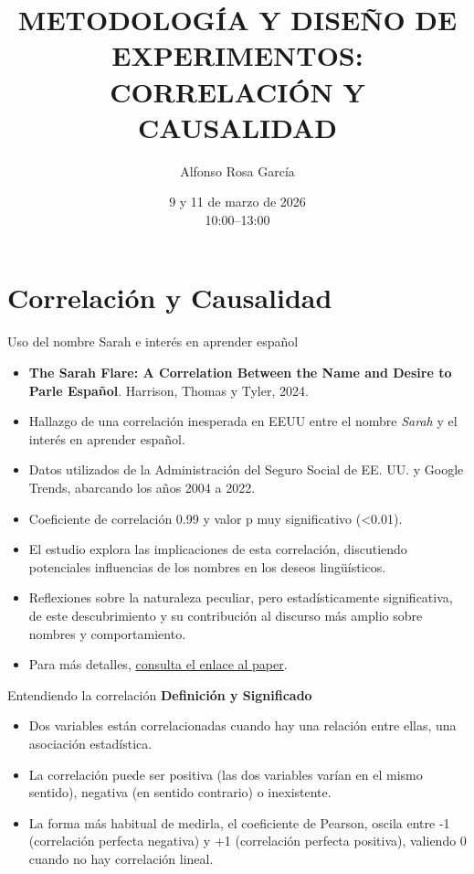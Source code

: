 ﻿\documentclass{beamer}
\title[DISEÑO DE EXPERIMENTOS]{METODOLOGÍA Y DISEÑO DE EXPERIMENTOS: \\ CORRELACIÓN Y CAUSALIDAD}
\author[Alfonso Rosa García]{Alfonso Rosa García }
\institute[G9]{\textbf{Grupo de Universidades G-9}}
\date{9 y 11 de marzo de 2026 \\ 10:00--13:00}
\begin{document}
\begin{frame}
  \titlepage
\end{frame}



\section{Correlación y Causalidad}

\begin{frame}{Uso del nombre Sarah e interés en aprender español}
  \begin{itemize}
    \item  \textbf{The Sarah Flare: A Correlation Between the Name and Desire to
Parle Español}. Harrison, Thomas y Tyler, 2024.
    \item Hallazgo de una correlación inesperada en EEUU entre el nombre \textit{Sarah} y el interés en aprender español.
    \item Datos utilizados de la Administración del Seguro Social de EE. UU. y Google Trends, abarcando los años 2004 a 2022.
    \item Coeficiente de correlación 0.99 y valor p muy significativo (\textless{}0.01).
    \item El estudio explora las implicaciones de esta correlación, discutiendo potenciales influencias de los nombres en los deseos lingüísticos.
    \item Reflexiones sobre la naturaleza peculiar, pero estadísticamente significativa, de este descubrimiento y su contribución al discurso más amplio sobre nombres y comportamiento.
    \item Para más detalles, \href{https://tylervigen.com/spurious/research-papers/4240_the-sarah-flare-a-correlation-between-the-name-and-desire-to-parle-espaol.pdf}{consulta el enlace al paper}.
    \end{itemize}
\end{frame}
\begin{frame}{Entendiendo la correlación}
    \textbf{Definición y Significado}
    \begin{itemize}
        \item Dos variables están correlacionadas cuando hay una relación entre ellas, una asociación estadística.
        \item La correlación puede ser positiva (las dos variables varían en el mismo sentido), negativa (en sentido contrario) o inexistente.
        \item La forma más habitual de medirla, el coeficiente de Pearson, oscila entre -1 (correlación perfecta negativa) y +1 (correlación perfecta positiva), valiendo 0 cuando no hay correlación lineal.
    \end{itemize}
\end{frame}
\end{document}
